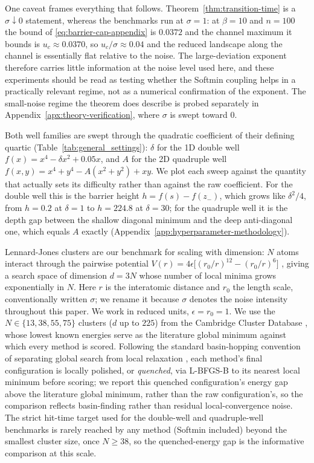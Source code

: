\documentclass{opt2026} %
\begin{document}
One caveat frames everything that follows. Theorem~\ref{thm:transition-time} is a $\sigma\downarrow0$ statement, whereas the benchmarks run at $\sigma=1$: at $\beta=10$ and $n=100$ the bound of \eqref{eq:barrier-cap-appendix} is $0.0372$ and the channel maximum it bounds is $u_c\approx0.0370$, so $u_c/\sigma\approx0.04$ and the reduced landscape along the channel is essentially flat relative to the noise. The large-deviation exponent therefore carries little information at the noise level used here, and these experiments should be read as testing whether the Softmin coupling helps in a practically relevant regime, not as a numerical confirmation of the exponent. The small-noise regime the theorem does describe is probed separately in Appendix~\ref{apx:theory-verification}, where $\sigma$ is swept toward $0$.

Both well families are swept through the quadratic coefficient of their defining quartic (Table~\ref{tab:general_settings}): $\delta$ for the 1D double well $f(x)=x^4-\delta x^2+0.05x$, and $A$ for the 2D quadruple well $f(x,y)=x^4+y^4-A(x^2+y^2)+xy$. We plot each sweep against the quantity that actually sets its difficulty rather than against the raw coefficient. For the double well this is the barrier height $h=f(s)-f(z_-)$, which grows like $\delta^2/4$, from $h=0.2$ at $\delta=1$ to $h=224.8$ at $\delta=30$; for the quadruple well it is the depth gap between the shallow diagonal minimum and the deep anti-diagonal one, which equals $A$ exactly (Appendix~\ref{app:hyperparameter-methodology}).

Lennard-Jones clusters are our benchmark for scaling with dimension: $N$ atoms interact through the pairwise potential $V(r)=4\epsilon\bigl[(r_0/r)^{12}-(r_0/r)^6\bigr]$ \citep{jones1924determination}, giving a search space of dimension $d=3N$ whose number of local minima grows exponentially in $N$. Here $r$ is the interatomic distance and $r_0$ the length scale, conventionally written $\sigma$; we rename it because $\sigma$ denotes the noise intensity throughout this paper. We work in reduced units, $\epsilon=r_0=1$. We use the $N\in\{13,38,55,75\}$ clusters ($d$ up to $225$) from the Cambridge Cluster Database \citep{wales1997global}, whose lowest known energies serve as the literature global minimum against which every method is scored. Following the standard basin-hopping convention of separating global search from local relaxation \citep{wales1997global}, each method's final configuration is locally polished, or \emph{quenched}, via L-BFGS-B to its nearest local minimum before scoring; we report this quenched configuration's energy gap above the literature global minimum, rather than the raw configuration's, so the comparison reflects basin-finding rather than residual local-convergence noise. The strict hit-time target used for the double-well and quadruple-well benchmarks is rarely reached by any method (Softmin included) beyond the smallest cluster size, once $N\geq38$, so the quenched-energy gap is the informative comparison at this scale.
\end{document}
